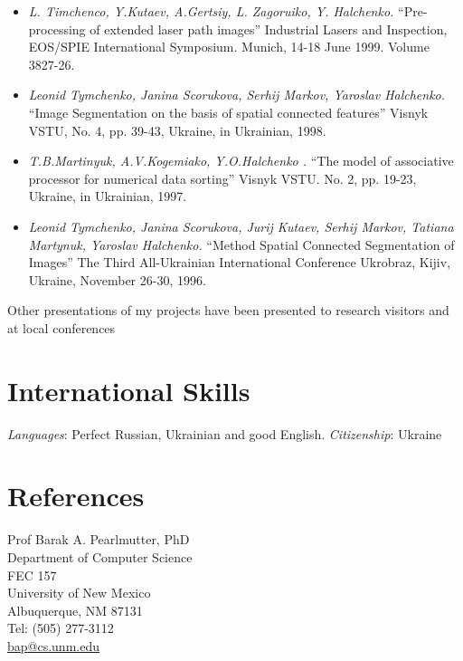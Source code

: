 \documentclass[10pt, overlapped, line]{res}
\newcommand{\mtitle}[1]{``#1''}
\newcommand{\mauthors}[1]{ {\it #1. }}
\newcommand{\mwhere}[1]{ #1. }
\begin{document}
\begin{resume}
\begin{itemize}
  \item 
    \mauthors{L. Timchenco, Y.Kutaev, A.Gertsiy, L. Zagoruiko, Y. Halchenko} 
    \mtitle{Pre-processing of extended laser path images} 
    \mwhere{Industrial Lasers and Inspection, EOS/SPIE International Symposium. Munich, 14-18 June 1999. Volume 3827-26}

  \item 
    \mauthors{Leonid Tymchenko, Janina Scorukova, Serhij Markov, Yaroslav Halchenko} 
    \mtitle{Image Segmentation on the basis of spatial connected features} 
    \mwhere{Visnyk VSTU, No. 4, pp. 39-43, Ukraine, in Ukrainian, 1998}

  \item 
    \mauthors{T.B.Martinyuk, A.V.Kogemiako, Y.O.Halchenko } 
    \mtitle{The model of associative processor for numerical data sorting} 
    \mwhere{ Visnyk VSTU. No. 2, pp. 19-23, Ukraine, in Ukrainian, 1997}

  \item 
    \mauthors{Leonid Tymchenko, Janina Scorukova, Jurij Kutaev, Serhij Markov, Tatiana Martynuk, Yaroslav Halchenko} 
    \mtitle{Method Spatial Connected Segmentation of Images}
    \mwhere{The Third All-Ukrainian International Conference Ukrobraz, Kijiv, Ukraine, November 26-30, 1996}
\end{itemize}

Other presentations of my projects have been presented to research visitors and at local conferences

\section{International Skills}
\emph{Languages}: Perfect Russian, Ukrainian and good English. 
\emph{Citizenship}: Ukraine

\section{References}
 \begin{multicols}{2}
{\small
   Prof Barak A. Pearlmutter, PhD \\
   Department of Computer Science \\
   FEC 157 \\
   University of New Mexico \\
   Albuquerque, NM  87131 \\
   Tel: (505) 277-3112  \\
   \href{URL}{bap@cs.unm.edu} \\

}
\end{multicols}
\end{resume}
\end{document}
